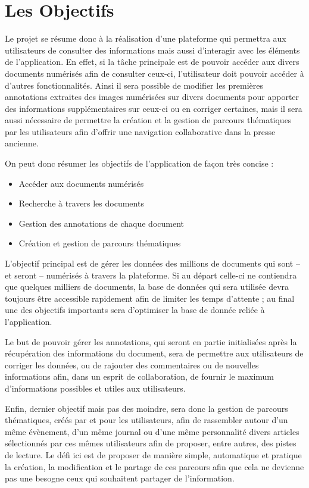 \section{Les Objectifs}
	\label{sec:objectifs}

    Le projet se résume donc à la réalisation d’une plateforme qui permettra aux utilisateurs de consulter des informations mais aussi d’interagir avec
    les éléments de l’application. En effet, si la tâche principale est de pouvoir accéder aux divers documents numérisés afin de consulter ceux-ci,
    l’utilisateur doit pouvoir accéder à d’autres fonctionnalités. Ainsi il sera possible de modifier les premières annotations extraites des images numérisées
    sur divers documents pour apporter des informations supplémentaires sur ceux-ci ou en corriger certaines, mais il sera aussi nécessaire de permettre
    la création et la gestion de parcours thématiques par les utilisateurs afin d’offrir une navigation collaborative dans la presse ancienne.

    On peut donc résumer les objectifs de l’application de façon très concise :
    \begin{itemize}
        \item{Accéder aux documents numérisés}
        \item{Recherche à travers les documents}
        \item{Gestion des annotations de chaque document}
        \item{Création et gestion de parcours thématiques}
    \end{itemize}

    L’objectif principal est de gérer les données des millions de documents qui sont – et seront – numérisés à travers la plateforme. Si au départ celle-ci
    ne contiendra que quelques milliers de documents, la base de données qui sera utilisée devra toujours être accessible rapidement afin de limiter les temps d’attente ;
    au final une des objectifs importants sera d’optimiser la base de donnée reliée à l’application.

    Le but de pouvoir gérer les annotations, qui seront en partie initialisées après la récupération des informations du document, sera de permettre aux utilisateurs
    de corriger les données, ou de rajouter des commentaires ou de nouvelles informations afin, dans un esprit de collaboration, de fournir le maximum d’informations
    possibles et utiles aux utilisateurs.

    Enfin, dernier objectif mais pas des moindre, sera donc la gestion de parcours thématiques, créés par et pour les utilisateurs, afin de rassembler autour d’un même
    évènement, d’un même journal ou d’une même personnalité divers articles sélectionnés par ces mêmes utilisateurs afin de proposer, entre autres, des pistes de lecture.
    Le défi ici est de proposer de manière simple, automatique et pratique la création, la modification et le partage de ces parcours afin que cela ne devienne pas une
    besogne ceux qui souhaitent partager de l’information.
